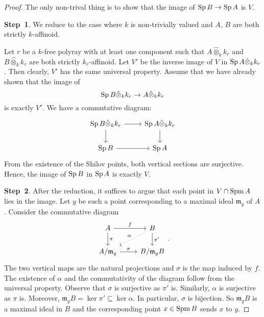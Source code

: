 \begin{proof}
    The only non-trival thing is to show that the image of $\operatorname{Sp} B\rightarrow \operatorname{Sp} A$ is $V$.

    \textbf{Step~1}. We reduce to the case where $k$ is non-trivially valued and $A$, $B$ are both strictly $k$-affinoid. 
    
    Let $r$ be a $k$-free polyray with at least one component such that $A\hat{\otimes}_k k_r$ and $B\hat{\otimes}_k k_r$ are both strictly $k_r$-affinoid. Let $V'$ be the inverse image of $V$ in $\operatorname{Sp} A\hat{\otimes}_k k_r$. Then clearly, $V'$ has the same universal property. Assume that we have already shown that the image of 
    \[
        \operatorname{Sp}   B\hat{\otimes}_k k_r\rightarrow A\hat{\otimes}_k k_r
    \]
    is exactly $V'$. We have a commutative diagram:
    \[
    \begin{tikzcd}
        \Sp B\hat{\otimes}_k k_r \arrow[r] \arrow[d] & \Sp A\hat{\otimes}_k k_r \arrow[d] \\
        \Sp B \arrow[r]                              & \Sp A                             
    \end{tikzcd}
    \]
    From the existence of the Shilov points, both vertical sections are surjective. Hence, the image of $\operatorname{Sp} B$ in $\operatorname{Sp} A$ is exactly $V$.

    \textbf{Step~2}. After the reduction, it suffices to argue that each point in $V\cap \operatorname{Spm} A$ lies in the image. Let $y$ be such a point corresponding to a maximal ideal $\mathfrak{m}_y$ of $A$. Consider the commutative diagram
    \[
        \begin{tikzcd}
            A \arrow[r, "f"] \arrow[d, "\pi"]    & B \arrow[d, "\pi'"] \arrow[ld, "\alpha"', dotted] \\
            A/\mathfrak{m}_y \arrow[r, "\sigma"] & B/\mathfrak{m}_yB                                
        \end{tikzcd}.  
    \]
    The two vertical maps are the natural projections and $\sigma$ is the map induced by $f$.
    The existence of $\alpha$ and the commutativity of the diagram follow from the universal property. Observe  that $\sigma$ is surjective as $\pi'$ is. Similarly, $\alpha$ is surjective as $\pi$ is. Moreover, $\mathfrak{m}_yB=\ker \pi'\subseteq \ker \alpha$. In particular, $\sigma$ is bijection. So $\mathfrak{m}_yB$ is a maximal ideal in $B$ and the corresponding point $x\in \operatorname{Spm} B$ sends $x$ to $y$.
\end{proof}

